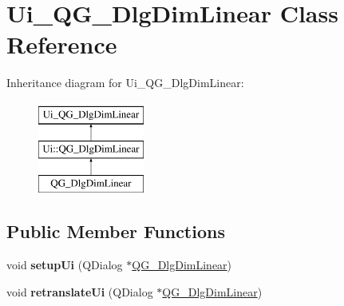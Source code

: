 \hypertarget{classUi__QG__DlgDimLinear}{\section{Ui\-\_\-\-Q\-G\-\_\-\-Dlg\-Dim\-Linear Class Reference}
\label{classUi__QG__DlgDimLinear}
}
Inheritance diagram for Ui\-\_\-\-Q\-G\-\_\-\-Dlg\-Dim\-Linear\-:\begin{figure}[H]
\begin{center}
\leavevmode
\includegraphics[height=3.000000cm]{classUi__QG__DlgDimLinear}
\end{center}
\end{figure}
\subsection*{Public Member Functions}
\begin{DoxyCompactItemize}
\item 
\hypertarget{classUi__QG__DlgDimLinear_af8da62f8138b4f2ff50182c84e4831ed}{void {\bfseries setup\-Ui} (Q\-Dialog $\ast$\hyperlink{classQG__DlgDimLinear}{Q\-G\-\_\-\-Dlg\-Dim\-Linear})}\label{classUi__QG__DlgDimLinear_af8da62f8138b4f2ff50182c84e4831ed}

\item 
\hypertarget{classUi__QG__DlgDimLinear_a2f6bc43b93fb545051441a5df1449da4}{void {\bfseries retranslate\-Ui} (Q\-Dialog $\ast$\hyperlink{classQG__DlgDimLinear}{Q\-G\-\_\-\-Dlg\-Dim\-Linear})}\label{classUi__QG__DlgDimLinear_a2f6bc43b93fb545051441a5df1449da4}

\end{DoxyCompactItemize}
